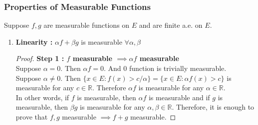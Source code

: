 \subsubsection{Properties of Measurable Functions}
Suppose $f,g$ are measurable functions on $E$ and are finite a.e. on $E$.
\begin{enumerate}
\item \textbf{Linearity : }$\alpha f + \beta g$ is measurable $\forall \alpha,\beta$
	\begin{proof}
		\textbf{Step 1 : $f$ measurable $\implies \alpha f$ measurable}\\	
		Suppose $\alpha = 0$.
		Then $\alpha f = 0$.
		And $0$ function is trivially measurable.\\
		Suppose $\alpha \ne 0$.
		Then $\{ x \in E : f(x) > c/\alpha \} = \{ x \in E : \alpha f(x) > c \}$ is measurable for any $c \in \mathbb{R}$.
		Therefore $\alpha f$ is measurable for any $\alpha \in \mathbb{R}$.\\

		In other words, if $f$ is measurable, then $\alpha f$ is measurable and if $g$ is measurable, then $\beta g$ is measurable for any $\alpha,\beta \in \mathbb{R}$.
		Therefore, it is enough to prove that $f,g$ measurable $\implies f+g$ measurable.


\end{proof}
\end{enumerate}
